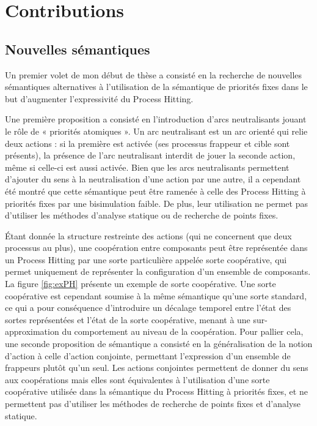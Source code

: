 \chapter{Contributions}

\section{Nouvelles sémantiques}\label{sec:semantiques}
Un premier volet de mon début de thèse a consisté en la recherche de nouvelles sémantiques alternatives à l'utilisation de la sémantique de priorités fixes dans le but d'augmenter l'expressivité du Process Hitting.

Une première proposition a consisté en l'introduction d'arcs neutralisants jouant le rôle de « priorités atomiques ».
Un arc neutralisant est un arc orienté qui relie deux actions :
si la première est activée (\ie ses processus frappeur et cible sont présents), la présence de l'arc neutralisant interdit de jouer la seconde action, même si celle-ci est aussi activée.
Bien que les arcs neutralisants permettent d'ajouter du sens à la neutralisation d'une action par une autre, il a cependant été montré que cette sémantique peut être ramenée à celle des Process Hitting à priorités fixes par une bisimulation faible.
De plus, leur utilisation ne permet pas d'utiliser les méthodes d'analyse statique ou de recherche de points fixes.


Étant donnée la structure restreinte des actions (qui ne concernent que deux processus au plus), une coopération entre composants peut être représentée dans un Process Hitting par une sorte particulière appelée sorte coopérative, qui permet uniquement de représenter la configuration d'un ensemble de composants.
La figure \ref{fig:exPH} présente un exemple de sorte coopérative.
Une sorte coopérative est cependant soumise à la même sémantique qu'une sorte standard, ce qui a pour conséquence d'introduire un décalage temporel entre l'état des sortes représentées et l'état de la sorte coopérative, menant à une sur-approximation du comportement au niveau de la coopération.
Pour pallier cela, une seconde proposition de sémantique a consisté en la généralisation de la notion d'action à celle d'action conjointe, permettant l'expression d'un ensemble de frappeurs plutôt qu'un seul.
Les actions conjointes permettent de donner du sens aux coopérations mais elles sont équivalentes à l'utilisation d'une sorte coopérative utilisée dans la sémantique du Process Hitting à priorités fixes, et ne permettent pas d'utiliser les méthodes de recherche de points fixes et d'analyse statique.

